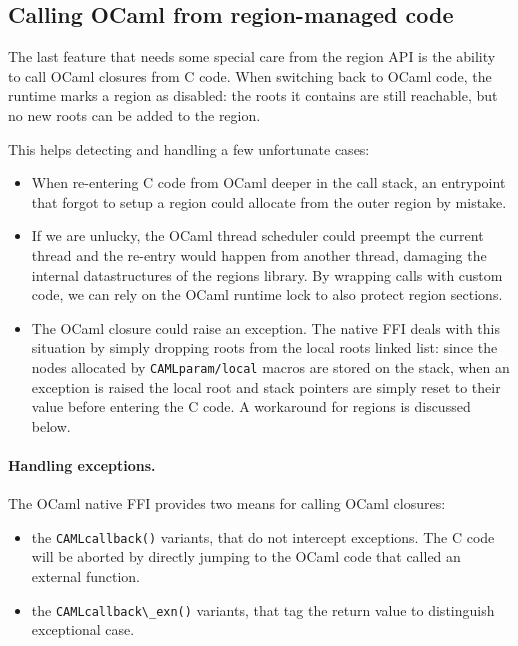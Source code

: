 \documentclass[a4paper]{easychair}
\newcommand{\cpp}[1]{\lstinline[style=C++]{#1}}
\begin{document}
\subsection{Calling OCaml from region-managed code}

The last feature that needs some special care from the region API is the
ability to call OCaml closures from C code. When switching back to OCaml
code, the runtime marks a region as disabled: the roots it contains are
still reachable, but no new roots can be added to the region.

This helps detecting and handling a few unfortunate cases:
%
\begin{itemize}
\item When re-entering C code from OCaml deeper in the call stack, an
      entrypoint that forgot to setup a region could allocate from the outer
      region by mistake.
\item If we are unlucky, the OCaml thread scheduler could preempt the
      current thread and the re-entry would happen from another
      thread, damaging the internal datastructures of the regions library. By
      wrapping calls with custom code, we can rely on the OCaml runtime lock to
      also protect region sections.
\item The OCaml closure could raise an exception. The native FFI deals with
      this situation by simply dropping roots from the local roots linked
      list: since the nodes allocated by \cpp{CAMLparam/local} macros are
      stored on the stack, when an exception is raised the local root and
      stack pointers are simply reset to their value before entering the C
      code. A workaround for regions is discussed below.
\end{itemize}

\paragraph{Handling exceptions.}

The OCaml native FFI provides two means for calling OCaml closures:
%
\begin{itemize}
\item the \cpp{CAMLcallback()} variants, that do not intercept
      exceptions. The C code will be aborted by directly jumping to the
      OCaml code that called an external function.
\item the \cpp{CAMLcallback\_exn()} variants, that tag the return value
      to distinguish exceptional case.
\end{itemize}
\end{document}
